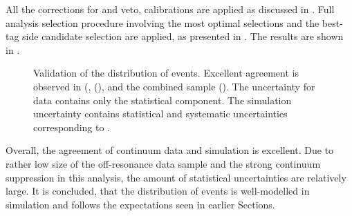 All the corrections for \piz and \eta veto, \FEI calibrations are applied as discussed in .
Full analysis selection procedure involving the most optimal selections and the best-tag side candidate selection are applied, as presented in .
The results are shown in .
\begin{figure}[htbp!]
    \caption{\label{fig:offresonance_validation} Validation of the \EB distribution of \epem\ra\qqbar events.
    Excellent agreement is observed in \feiBp (, \feiBz (),
    and the combined sample ().
    The uncertainty for data contains only the statistical component.
    The simulation uncertainty contains statistical and systematic uncertainties corresponding to .
    }
\end{figure}

Overall, the agreement of continuum data and simulation is excellent.
Due to rather low size of the off-resonance data sample and the strong continuum suppression in this analysis, the amount of statistical uncertainties are relatively large.
It is concluded, that the \EB distribution of \epem\ra\qqbar events is well-modelled in simulation and follows the expectations seen in earlier Sections.

